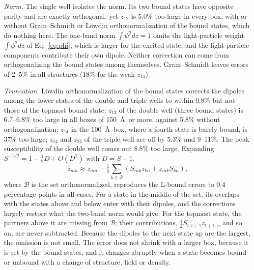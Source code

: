\documentclass[11pt]{article}
\begin{document}
\emph{Norm.} The single well isolates the norm. Its two bound states have opposite parity and are exactly orthogonal, yet $z_{12}$ is 5.0\% too large in every box, with or without Gram--Schmidt or L\"owdin orthonormalization of the bound states, which do nothing here. The one-band norm $\int\psi^2dz=1$ omits the light-particle weight $\int\phi^2dz$ of Eq.~\eqref{eq:phi}, which is larger for the excited state, and the light-particle components contribute their own dipole. Neither correction can come from orthogonalizing the bound states among themselves. Gram--Schmidt leaves errors of 2--5\% in all structures (18\% for the weak $z_{14}$).

\emph{Truncation.} L\"owdin orthonormalization of the bound states corrects the dipoles among the lower states of the double and triple wells to within 0.8\% but not those of the topmost bound state: $z_{13}$ of the double well (three bound states) is 6.7--6.8\% too large in all boxes of 150~\AA\ or more, against 5.8\% without orthogonalization; $z_{14}$ in the 100~\AA\ box, where a fourth state is barely bound, is 37\% too large; $z_{14}$ and $z_{24}$ of the triple well are off by 5.3\% and 9--11\%. The peak susceptibility of the double well comes out 8.8\% too large. Expanding $S^{-1/2}=1-\tfrac12D+O(D^2)$ with $D=S-1$,
\begin{equation}
\tilde z_{mn}\approx z_{mn}-\tfrac12\sum_{k\in\mathcal B}\left(S_{mk}z_{kn}+z_{mk}S_{kn}\right),
\end{equation}
where $\mathcal B$ is the set orthonormalized, reproduces the L-bound errors to 0.4 percentage points in all cases. For a state in the middle of the set, its overlaps with the states above and below enter with their dipoles, and the corrections largely restore what the two-band norm would give. For the topmost state, the partners above it are missing from $\mathcal B$; their contributions, $\tfrac12S_{t,t+1}z_{t+1,n}$ and so on, are never subtracted. Because the dipoles to the next state up are the largest, the omission is not small. The error does not shrink with a larger box, because it is set by the bound states, and it changes abruptly when a state becomes bound or unbound with a change of structure, field or density.
\end{document}
